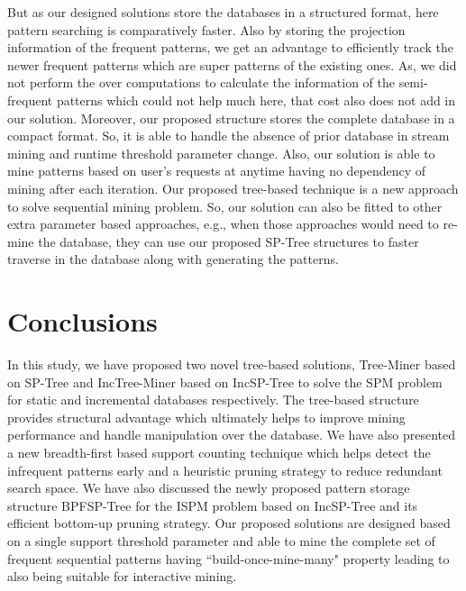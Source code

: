 But as our designed solutions store the databases in a structured format, here pattern searching is comparatively faster. Also by storing the projection information of the frequent patterns, we get an advantage to efficiently track the newer frequent patterns which are super patterns of the existing ones. As, we did not perform the over computations to calculate the information of the semi-frequent patterns which could not help much here, that cost also does not add in our solution. Moreover, our proposed structure stores the complete database in a compact format. So, it is able to handle the absence of prior database in stream mining and runtime threshold parameter change. Also, our solution is able to mine patterns based on user's requests at anytime having no dependency of mining after each iteration. Our proposed tree-based technique is a new approach to solve sequential mining problem. So, our solution can also be fitted to other extra parameter based approaches, e.g., when those approaches would need to re-mine the database, they can use our proposed SP-Tree structures to faster traverse in the database along with generating the patterns.



\section{Conclusions} \label{conclusion}
In this study, we have proposed two novel tree-based solutions, Tree-Miner based on SP-Tree and IncTree-Miner based on IncSP-Tree to solve the SPM problem for static and incremental databases respectively. The tree-based structure provides structural advantage which ultimately helps to improve mining performance and handle manipulation over the database. We have also presented a new breadth-first based support counting technique which helps detect the infrequent patterns early and a heuristic pruning strategy to reduce redundant search space. We have also discussed the newly proposed pattern storage structure BPFSP-Tree for the ISPM problem based on IncSP-Tree and its efficient bottom-up pruning strategy. Our proposed solutions are designed based on a single support threshold parameter and able to mine the complete set of frequent sequential patterns having ``build-once-mine-many" property leading to also being suitable for interactive mining.


